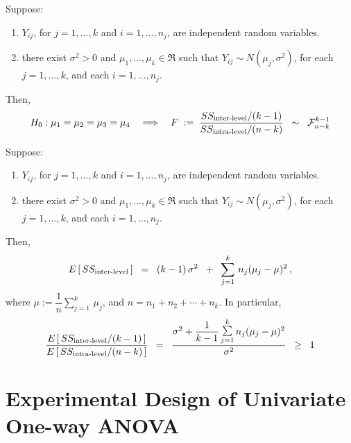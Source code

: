 \documentclass{article}
\begin{document}
\begin{corollary}
\mbox{}\vskip 0.15cm\noindent
Suppose:
\begin{enumerate}
\item  $Y_{ij}$, for $j = 1, \ldots, k$ and $i = 1, \ldots, n_{j}$, are independent random variables.
\item  there exist $\sigma^{2} > 0$ and $\mu_{1}, \ldots, \mu_{k} \in \Re$ such that $Y_{ij} \sim N(\mu_{j},\sigma^{2})$, for each $j = 1, \ldots, k$, and each $i = 1, \ldots, n_{j}$.
\end{enumerate}
Then,
\begin{equation*}
H_{0}:\mu_{1} = \mu_{2} = \mu_{3} = \mu_{4}
\quad\Longrightarrow\quad
F \;:=\; \dfrac{SS_{\textnormal{inter-level}}/(k-1)}{SS_{\textnormal{intra-level}}/(n-k)} \;\; \sim \;\; \mathcal{F}^{k-1}_{n-k}
\end{equation*}
\end{corollary}

\begin{lemma}
\mbox{}\vskip 0.15cm\noindent
Suppose:
\begin{enumerate}
\item  $Y_{ij}$, for $j = 1, \ldots, k$ and $i = 1, \ldots, n_{j}$, are independent random variables.
\item  there exist $\sigma^{2} > 0$ and $\mu_{1}, \ldots, \mu_{k} \in \Re$ such that $Y_{ij} \sim N(\mu_{j},\sigma^{2})$, for each $j = 1, \ldots, k$, and each $i = 1, \ldots, n_{j}$.
\end{enumerate}
Then,
\begin{equation*}
E\left[\,SS_{\textnormal{inter-level}}\,\right]
\;\; = \;\;
(k-1)\,\sigma^{2} \;\; + \;\; \sum^{k}_{j=1}\,n_{j}(\mu_{j}-\mu)^{2}\,,
\end{equation*}
where $\mu := \dfrac{1}{n}\sum^{k}_{j=1}\,\mu_{j}$, and $n = n_{1} + n_{2} + \cdots + n_{k}$.  In particular,
\begin{equation*}
\dfrac{E\left[\,SS_{\textnormal{inter-level}}/(k-1)\,\right]}{E\left[\,SS_{\textnormal{intra-level}}/(n-k)\,\right]}
\;\; = \;\;
\dfrac{\sigma^{2}+\dfrac{1}{k-1}\,\underset{j=1}{\overset{k}{\textnormal{\Large$\sum$}}}\,n_{j}(\mu_{j}-\mu)^{2}}{\sigma^{2}}
\;\; \geq \;\; 1
\end{equation*}
\end{lemma}


\section{Experimental Design of Univariate One-way ANOVA}
\setcounter{theorem}{0}
\end{document}
